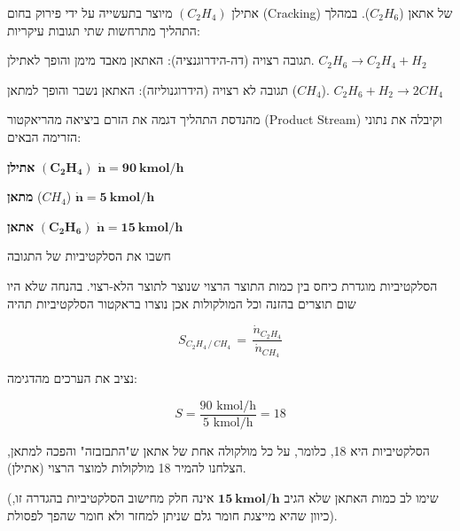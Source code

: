 \documentclass[
  hebrew,
  letterpaper,
  DIV=11,
  numbers=noendperiod]{scrreprt}
\begin{document}
אתילן \((C_{2}H_{4})\) מיוצר בתעשייה על ידי פירוק בחום (Cracking) של
אתאן (\(C_{2}H_{6}\)). במהלך התהליך מתרחשות שתי תגובות עיקריות:

תגובה רצויה (דה-הידרוגנציה): האתאן מאבד מימן והופך לאתילן.
\(C_{2}H_{6} \rightarrow C_{2}H_{4} + H_{2}\)

תגובה לא רצויה (הידרוגנוליזה): האתאן נשבר והופך למתאן (\(CH_{4}\)).
\(C_{2}H_{6} + H_{2} \rightarrow 2CH_{4}\)

מהנדסת התהליך דגמה את הזרם ביציאה מהריאקטור (Product Stream) וקיבלה את
נתוני הזרימה הבאים:

\textbf{אתילן}
\(\left( \mathbf{C}_{\mathbf{2}}\mathbf{H}_{\mathbf{4}} \right)\)
\(\dot{\mathbf{n}}\mathbf{= 90\ kmol/h\ }\)

\textbf{מתאן} (\(CH_{4}\)) \(\dot{\mathbf{n}}\mathbf{= 5\ kmol/h}\)

\textbf{אתאן}
\(\left( \mathbf{C}_{\mathbf{2}}\mathbf{H}_{\mathbf{6}} \right)\)
\(\dot{\mathbf{n}}\mathbf{= 15\ kmol/h\ }\)

חשבו את הסלקטיביות של התגובה

\begin{tcolorbox}[enhanced jigsaw, colback=white, arc=.35mm, coltitle=black, breakable, toptitle=1mm, leftrule=.75mm, colbacktitle=quarto-callout-note-color!10!white, opacitybacktitle=0.6, bottomtitle=1mm, titlerule=0mm, opacityback=0, colframe=quarto-callout-note-color-frame, title=\textcolor{quarto-callout-note-color}{\faInfo}\hspace{0.5em}{פתרון}, rightrule=.15mm, bottomrule=.15mm, toprule=.15mm, left=2mm]

הסלקטיביות מוגדרת כיחס בין כמות התוצר הרצוי שנוצר לתוצר הלא-רצוי. בהנחה
שלא היו שום תוצרים בהזנה וכל המולקולות אכן נוצרו בראקטור הסלקטיביות תהיה

\[S_{C_{2}H_{4}\,\text{/}\, CH_{4}}\, = \,\frac{{\dot{n}}_{C_{2}H_{4}}}{{\dot{n}}_{CH_{4}}}\]

נציב את הערכים מהדגימה:

\[S = \frac{90\text{ kmol/h}}{5\text{ kmol/h}} = 18\]

הסלקטיביות היא 18, כלומר, על כל מולקולה אחת של אתאן ש"התבזבזה" והפכה
למתאן, הצלחנו להמיר 18 מולקולות למוצר הרצוי (אתילן).

(שימו לב כמות האתאן שלא הגיב \(\mathbf{15\ kmol/h}\) אינה חלק מחישוב
הסלקטיביות בהגדרה זו, כיוון שהיא מייצגת חומר גלם שניתן למחזר ולא חומר
שהפך לפסולת).

\end{tcolorbox}
\end{document}
